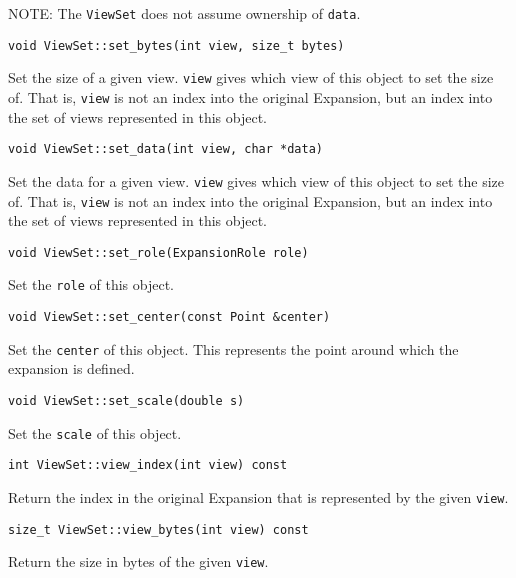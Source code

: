 NOTE: The \texttt{ViewSet} does not assume ownership of \texttt{data}.

\begin{lstlisting}
void ViewSet::set_bytes(int view, size_t bytes)
\end{lstlisting}

\noindent Set the size of a given view. \texttt{view} gives which view of this
object to set the size of. That is, \texttt{view} is not an index into the
original Expansion, but an index into the set of views represented in this
object.

\begin{lstlisting}
void ViewSet::set_data(int view, char *data)
\end{lstlisting}

\noindent Set the data for a given view. \texttt{view} gives which view of this
object to set the size of. That is, \texttt{view} is not an index into the
original Expansion, but an index into the set of views represented in this
object.

\begin{lstlisting}
void ViewSet::set_role(ExpansionRole role)
\end{lstlisting}

\noindent Set the \texttt{role} of this object.

\begin{lstlisting}
void ViewSet::set_center(const Point &center)
\end{lstlisting}

\noindent Set the \texttt{center} of this object. This represents the point
around which the expansion is defined.

\begin{lstlisting}
void ViewSet::set_scale(double s)
\end{lstlisting}

\noindent Set the \texttt{scale} of this object.

\begin{lstlisting}
int ViewSet::view_index(int view) const
\end{lstlisting}

\noindent Return the index in the original Expansion that is represented by the
given \texttt{view}.

\begin{lstlisting}
size_t ViewSet::view_bytes(int view) const
\end{lstlisting}

\noindent Return the size in bytes of the given \texttt{view}.

